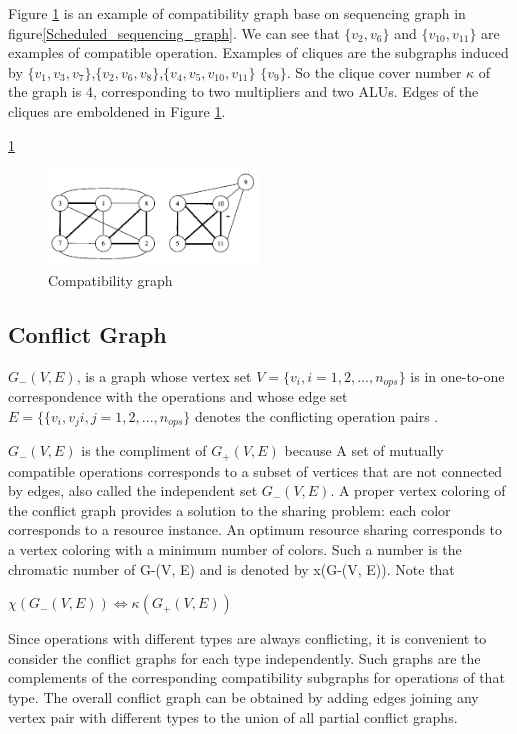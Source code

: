 Figure \ref{fig:Compatibility_graph} is an example of compatibility graph base on sequencing graph in figure\ref{Scheduled_sequencing_graph}. We can see that $\{v_{2},v_{6}\}  $ and $\{v_{10},v_{11}\} $ are examples of compatible operation.  Examples of cliques are the subgraphs induced by $\{v_{1},v_{3},v_{7}\}  $,$\{ v_{2},v_{6},v_{8}\} $,$\{ v_{4},v_{5}, v_{10}, v_{11}\}$ $ \{v_{9}\} $. So the clique cover number $ \kappa $ of the graph is 4, corresponding to two multipliers and two ALUs. Edges of the cliques are emboldened in Figure \ref{fig:Compatibility_graph}.


\ref{fig:Compatibility_graph}
\begin{figure}[h]
    \centering
    \includegraphics[width=0.5\textwidth]{Compatibility_graph}
    \caption{ Compatibility graph \cite{b1}}
    \label{fig:Compatibility_graph}
\end{figure}


\subsection{Conflict Graph}
$G_{-}(V,E)  $,  is a graph whose vertex set $  V = \{v_{i}, i = 1,2,..., n_{ops}\} $ is in one-to-one correspondence with the operations and whose edge set $ E = \{\{v_{i},v_{j} i,j = 1,2,...,n_{ops}\}$ denotes the conflicting operation pairs \cite{b1}. 

$G_{-}(V,E) $ is the compliment of $G_{+}(V,E)  $ because A set of mutually compatible operations corresponds to a subset of vertices that are not connected by edges, also called the independent set $G_{-}(V,E)  $. A proper vertex coloring of the conflict graph provides a solution to the sharing problem: each color corresponds to a resource instance. An optimum resource sharing corresponds to a vertex coloring with a minimum number of colors. Such a number is the chromatic number of G-(V, E) and is denoted by x(G-(V, E)). Note that 
\begin{center}
$\chi(G_{-}(V,E))  \Leftrightarrow \kappa(G_{+}(V,E)) $
\end{center}

Since operations with different types are always conflicting, it is convenient to consider the conflict graphs for each type independently. Such graphs are the complements of the corresponding compatibility subgraphs for operations of that type. The overall conflict graph can be obtained by adding edges joining any vertex pair with different types to the union of all partial conflict graphs. 

